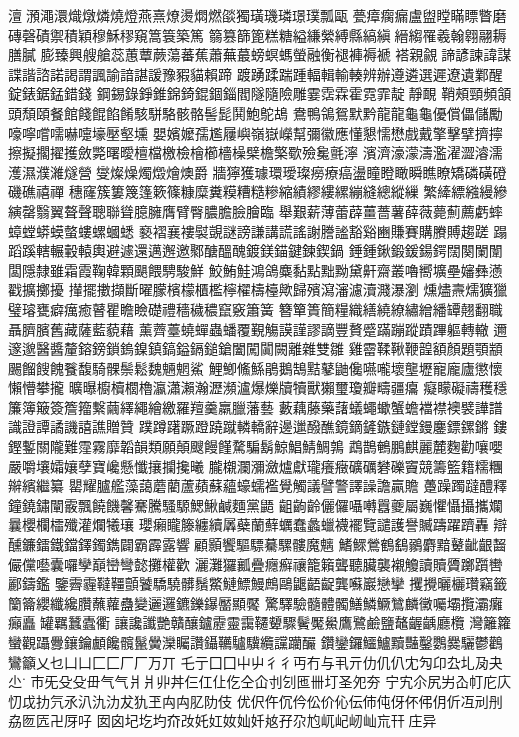 澶澦澠澴熾燉燐燒燈燕熹燎燙燜燃燄獨璜璣璘璟璞瓢甌
甍瘴瘸瘺盧盥瞠瞞瞟瞥磨磚磬磧禦積穎穆穌穋窺篙簑築篤
篛篡篩篦糕糖縊縑縈縛縣縞縝縉縐罹羲翰翱翮耨膳膩
膨臻興艘艙蕊蕙蕈蕨蕩蕃蕉蕭蕪蕞螃螟螞螢融衡褪褲褥褫
褡親覦諦諺諫諱謀諜諧諮諾謁謂諷諭諳諶諼豫豭貓賴蹄
踱踴蹂踹踵輻輯輸輳辨辦遵遴選遲遼遺鄴醒錠錶鋸錳錯錢
鋼錫錄錚錐錦錡錕錮錙閻隧隨險雕霎霑霖霍霓霏靛靜靦
鞘頰頸頻頷頭頹頤餐館餞餛餡餚駭駢駱骸骼髻髭鬨鮑鴕鴣
鴦鴨鴒鴛默黔龍⿓龜⿔優償儡儲勵嚎嚀嚐嚅嚇嚏壕壓壑壎
嬰嬪嬤孺尷屨嶼嶺嶽嶸幫彌徽應懂懇懦懋戲戴擎擊擘擠擰
擦擬擱擢擭斂斃曙曖檀檔檄檢檜櫛檣橾檗檐檠歜殮毚氈濘
濱濟濠濛濤濫濯澀濬濡濩濕濮濰燧營燮燦燥燭燬燴燠爵
牆獰獲璩環璦璨癆療癌盪瞳瞪瞰瞬瞧瞭矯磷磺磴磯礁禧禪
穗窿簇簍篾篷簌篠糠糜糞糢糟糙糝縮績繆縷縲繃縫總縱繅
繁縴縹繈縵縿縯罄翳翼聱聲聰聯聳臆臃膺臂臀膿膽臉膾臨
舉艱薪薄蕾薜薑薔薯薛薇薨薊薦虧蟀蟑螳蟒蟆螫螻螺蟈蟋
褻褶襄褸褽覬謎謗謙講謊謠謝謄謐豁谿豳賺賽購賸賻趨蹉
蹋蹈蹊轄輾轂轅輿避遽還邁邂邀鄹醣醞醜鍍鎂錨鍵鍊鍥鍋
錘鍾鍬鍛鍰鍚鍔闊闋闌闈闆隱隸雖霜霞鞠韓顆颶餵騁駿鮮
鮫鮪鮭鴻鴿麋黏點黜黝黛鼾齋叢嚕嚮壙壘嬸彝懣戳擴擲擾
攆擺擻擷斷曜朦檳檬櫃檻檸櫂檮檯歟歸殯瀉瀋濾瀆濺瀑瀏
燻燼燾燸獷獵璧璿甕癖癘癒瞽瞿瞻瞼礎禮穡穢穠竄竅簫簧
簪簞簣簡糧織繕繞繚繡繒繙罈翹翻職聶臍臏舊藏薩藍藐藉
薰薺薹蟯蟬蟲蟠覆覲觴謨謹謬謫豐贅蹙蹣蹦蹤蹟蹕軀轉轍
邇邃邈醫醬釐鎔鎊鎖鎢鎳鎮鎬鎰鎘鎚鎗闔闖闐闕離雜雙雛
雞霤鞣鞦鞭韹額顏題顎顓颺餾餿餽餮馥騎髁鬃鬆魏魎魍鯊
鯉鯽鯈鯀鵑鵝鵠黠鼕鼬儳嚥嚨壞壟壢寵龐廬懲懷懶懵攀攏
曠曝櫥櫝櫚櫓瀛瀟瀨瀚瀝瀕瀘爆爍牘犢獸獺璽瓊瓣疇疆癟
癡矇礙禱穫穩簾簿簸簽簷籀繫繭繹繩繪繳羅羶羹羸臘藩藝
藪藕藤藥藷蟻蠅蠍蟹蟾襠襟襖襞譁譜識證譚譎譏譆譙贈贊
蹼蹲躇蹶蹬蹺蹴轔轎辭邊邋醱醮鏡鏑鏟鏃鏈鏜鏝鏖鏢鏍鏘
鏤鏗鏨關隴難霪霧靡韜韻類願顛颼饅饉騖騙鬍鯨鯧鯖鯛鶉
鵡鵲鵪鵬麒麗麓麴勸嚷嚶嚴嚼壤孀孃孽寶巉懸懺攘攔攙曦
朧櫬瀾瀰瀲爐獻瓏癢癥礦礪礬礫竇競籌籃籍糯糰辮繽繼纂
罌耀臚艦藻藹蘑藺蘆蘋蘇蘊蠔蠕襤覺觸議譬警譯譟譫贏贍
躉躁躅躂醴釋鐘鐃鏽闡霰飄饒饑馨騫騰騷騵鰓鰍鹹麵黨鼯
齟齣齡儷儸囁囀囂夔屬巍懼懾攝攜斕曩櫻欄櫺殲灌爛犧瓖
瓔癩矓籐纏續羼蘗蘭蘚蠣蠢蠡蠟襪襬覽譴護譽贓躊躍躋轟
辯醺鐮鐳鐵鐺鐸鐲鐫闢霸霹露響顧顥饗驅驃驀騾髏魔魑
鰭鰥鶯鶴鷂鶸麝黯鼙齜齦齧儼儻囈囊囉孿巔巒彎懿攤權歡
灑灘玀瓤疊癮癬禳籠籟聾聽臟襲襯觼讀贖贗躑躓轡酈鑄鑑
鑒霽霾韃韁顫饕驕驍髒鬚鱉鰱鰾鰻鷓鷗鼴齬齪龔囌巖戀攣
攫攪曬欐瓚竊籤籣籥纓纖纔臢蘸蘿蠱變邐邏鑣鑠鑤靨顯饜
驚驛驗髓體髑鱔鱗鱖鷥麟黴囑壩攬灞癱癲矗罐羈蠶蠹衢
讓讒讖艷贛釀鑪靂靈靄韆顰驟鬢魘鱟鷹鷺鹼鹽鼇齷齲廳欖
灣籬籮蠻觀躡釁鑲鑰顱饞髖鬣黌灤矚讚鑷韉驢驥纜讜躪釅
鑽鑾鑼鱷鱸黷豔鑿鸚爨驪鬱鸛鸞籲乂乜⼐凵⼕匚⼚厂万丌
乇亍⼞囗⼬屮⼻彳丏冇与丮亓仂仉仈冘勼卬厹圠夃夬尐
巿旡⽎殳毌⽓气⽙爿丱丼仨仜仩仡仝仚刌刉匜卌圢圣夗夯
宁宄尒尻屴屳帄庀庂忉戉扐氕氶汃氿氻犮犰玊⽱禸肊阞伎
优伬仵伔仱伀价伈伝伂伅伢伓伄仴伒冱刓刐劦匢匟卍厊吇
囡囟圮圪圴夼妀奼妅奻奾奷奿孖尕尥屼屺屻屾巟幵庄异
